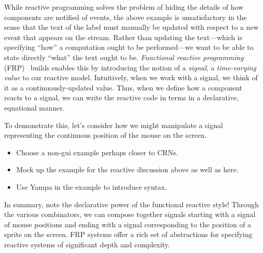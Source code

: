 While reactive programming solves the problem of hiding the details of how components are notified of events, the above example is unsatisfactory in the sense that the text of the label must manually be updated with respect to a new event that appears on the stream.
Rather than updating the text---which is specifying ``how'' a computation ought to be performed---we want to be able to state directly ``what'' the text ought to be.
\emph{Functional reactive programming} (FRP)~\cite{elliott1997, czaplicki2013, finkbeiner2019, jeffrey2012} builds enables this by introducing the notion of a \emph{signal}, a \emph{time-varying value} to our reactive model.
Intuitively, when we work with a signal, we think of it as a continuously-updated value.
Thus, when we define how a component reacts to a signal, we can write the reactive code in terms in a declarative, equational manner.

To demonstrate this, let's consider how we might manipulate a signal representing the continuous position of the mouse on the screen.
\begin{itemize}
  \item Choose a non-gui example perhaps closer to CRNs.
  \item Mock up the example for the reactive discussion above as well as here.
  \item Use Yampa in the example to introduce syntax.
\end{itemize}

In summary, note the declarative power of the functional reactive style!
Through the various combinators, we can compose together signals starting with a signal of mouse positions and ending with a signal corresponding to the position of a sprite on the screen.
FRP systems offer a rich set of abstractions for specifying reactive systems of significant depth and complexity.

